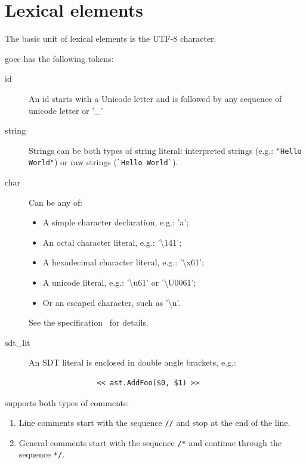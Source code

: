 \documentclass[12pt]{article}
\begin{document}
\section{Lexical elements} \label{sec:lexical elements}
	
	The basic unit of lexical elements is the UTF-8 character.

	gocc has the following tokens:

	\begin{description}
		\item[id] An id starts with a Unicode letter and is followed by any sequence of unicode letter or '\_'

		\item[string] Strings can be both types of \Go string literal: interpreted strings (e.g.: \verb|"Hello World"|) or raw strings (\verb|`Hello World`|).

		\item[char] Can be any of:

			\begin{itemize}
				\item A simple character declaration, e.g.: 'a';
				\item An octal character literal, e.g.: '\textbackslash 141';
				\item A hexadecimal character literal, e.g.: '\textbackslash x61';
				\item A unicode literal, e.g.: '\textbackslash u61' or '\textbackslash U0061';
				\item Or an escaped character, such as '\textbackslash n'.
			\end{itemize}

			See the \Go specification~\cite{gospec} for details.

		\item[sdt\_lit] An SDT literal is enclosed in double angle brackets, e.g.: 
			\begin{verbatim}
				<< ast.AddFoo($0, $1) >>
			\end{verbatim}
	\end{description}

	\gocc supports both types of \Go comments:
	\begin{enumerate}
		\item Line comments start with the sequence \verb|//| and stop at the end of the line.
		\item General comments start with the sequence \verb|/*| and continue through the sequence \verb|*/|.
	\end{enumerate}
		
\end{document}
